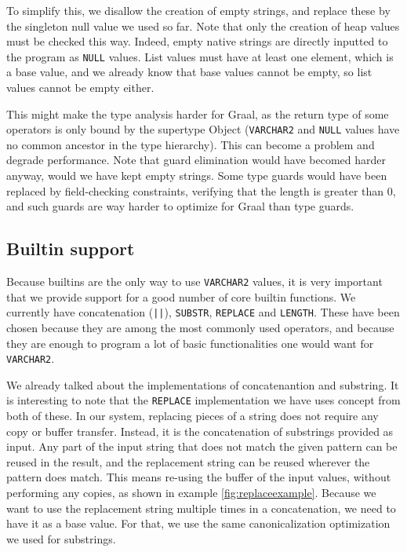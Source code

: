 \documentclass[twoside,11pt,a4paper]{article}
\newcommand{\java}[1]{\textsf{#1}}
\newcommand{\pls}[1]{\texttt{#1}}
\newcommand{\plstype}[1]{\pls{#1}}
\newcommand{\varchar}{\plstype{VARCHAR2}}
\newcommand{\plsnull}{\pls{NULL}}
\begin{document}
To simplify this, we disallow the creation of empty strings, and replace these by the singleton null value we used so far. Note that only the creation of heap values must be checked this way. Indeed, empty native strings are directly inputted to the program as \plsnull{} values. List values must have at least one element, which is a base value, and we already know that base values cannot be empty, so list values cannot be empty either.

This might make the type analysis harder for Graal, as the return type of some operators is only bound by the supertype \java{Object} (\varchar{} and \plsnull{} values have no common ancestor in the type hierarchy). This can become a problem and degrade performance. Note that guard elimination would have becomed harder anyway, would we have kept empty strings. Some type guards would have been replaced by field-checking constraints, verifying that the length is greater than 0, and such guards are way harder to optimize for Graal than type guards.

\subsection{Builtin support}


Because builtins are the only way to use \varchar{} values, it is very important that we provide support for a good number of core builtin functions. We currently have concatenation (\pls{||}), \pls{SUBSTR}, \pls{REPLACE} and \pls{LENGTH}. These have been chosen because they are among the most commonly used operators, and because they are enough to program a lot of basic functionalities one would want for \varchar{}.

We already talked about the implementations of concatenantion and substring. It is interesting to note that the \pls{REPLACE} implementation we have uses concept from both of these. In our system, replacing pieces of a string does not require any copy or buffer transfer. Instead, it is the concatenation of substrings provided as input. Any part of the input string that does not match the given pattern can be reused in the result, and the replacement string can be reused wherever the pattern does match. This means re-using the buffer of the input values, without performing any copies, as shown in example \ref{fig:replaceexample}. Because we want to use the replacement string multiple times in a concatenation, we need to have it as a base value. For that, we use the same canonicalization optimization we used for substrings.
\end{document}
